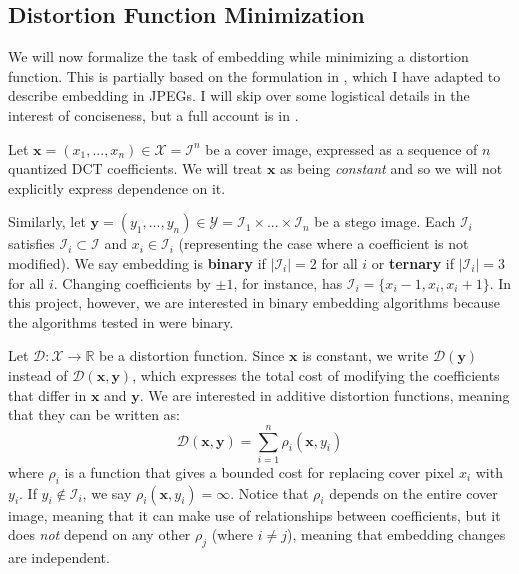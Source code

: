 \documentclass[11pt,a4paper,twoside,openright]{report}
\begin{document}
\subsection{Distortion Function Minimization} \label{sec:distortion-function-min}

We will now formalize the task of embedding while minimizing a distortion function. This is partially based on the formulation in \cite{stc-paper}, which I have adapted to describe embedding in JPEGs. I will skip over some logistical details in the interest of conciseness, but a full account is in \cite{stc-paper}.

Let $\bm{x} = (x_1,...,x_n) \in \mathcal{X} = \mathcal{I}^n$ be a cover image, expressed as a sequence of $n$ quantized DCT coefficients. We will treat $\bm{x}$ as being \textit{constant} and so we will not explicitly express dependence on it.

Similarly, let $\bm{y} = (y_1,...,y_n) \in \mathcal{Y} = \mathcal{I}_1 \times ... \times \mathcal{I}_n$ be a stego image. Each $\mathcal{I}_i$ satisfies $\mathcal{I}_i \subset \mathcal{I}$ and $x_i \in \mathcal{I}_i$ (representing the case where a coefficient is not modified). We say embedding is \textbf{binary} if $| \mathcal{I}_i | = 2$ for all $i$ or \textbf{ternary} if $| \mathcal{I}_i | = 3$ for all $i$. Changing coefficients by $\pm 1$, for instance, has $\mathcal{I}_i = \{ x_i-1, x_i, x_i+1 \}$. In this project, however, we are interested in binary embedding algorithms because the algorithms tested in \cite{2008-paper} were binary.

Let $\mathcal{D} : \mathcal{X} \to \mathbb{R}$ be a distortion function. Since $\bm{x}$ is constant, we write $\mathcal{D}(\bm{y})$ instead of $\mathcal{D}(\bm{x},\bm{y})$, which expresses the total cost of modifying the coefficients that differ in $\bm{x}$ and $\bm{y}$. We are interested in additive distortion functions, meaning that they can be written as:
\begin{equation*}
	\mathcal{D}(\bm{x},\bm{y}) = \sum_{i=1}^n \rho_i(\bm{x},y_i)
\end{equation*}
where $\rho_i$ is a function that gives a bounded cost for replacing cover pixel $x_i$ with $y_i$. If $y_i \notin \mathcal{I}_i$, we say $\rho_i(\bm{x},y_i) = \infty$. Notice that $\rho_i$ depends on the entire cover image, meaning that it can make use of relationships between coefficients, but it does \textit{not} depend on any other $\rho_j$ (where $i \neq j$), meaning that embedding changes are independent.
\end{document}
